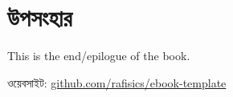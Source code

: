 \chapter*{উপসংহার}

This is the end/epilogue of the book. \blindtext \\

\begin{mylist}
\item ওয়েবসাইট: \href{https://github.com/rafisics/ebook-template}{github.com/rafisics/ebook-template}
\end{mylist}

\chapterend

\pagestyle{empty}
\cleardoublepage \  %

